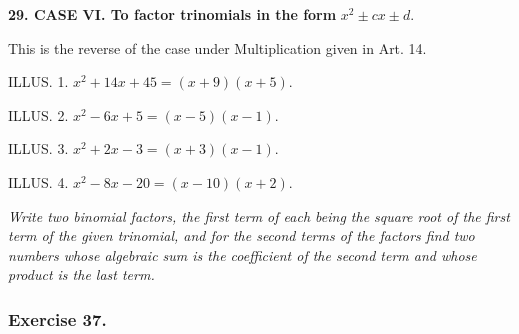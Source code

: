\documentclass{book}
\begin{document}
\textbf{29. CASE VI. To factor trinomials in the form}
$x^2 \pm cx \pm d.$

This is the reverse of the case under Multiplication
given in Art. 14.

ILLUS. 1. $x^2 + 14x + 45 = (x + 9)(x + 5)$.

ILLUS. 2. $x^2 - 6x + 5 = (x - 5)(x - 1)$.

ILLUS. 3. $x^2 + 2x - 3 = (x + 3)(x - 1)$.

ILLUS. 4. $x^2 - 8x - 20 = (x - 10)(x + 2)$.

\textit{Write two binomial factors, the first term of each
being the square root of the first term of the given
trinomial, and for the second terms of the factors
find two numbers whose algebraic sum is the coefficient
of the second term and whose product is the
last term.}

\subsubsection*{Exercise 37.}
\end{document}
